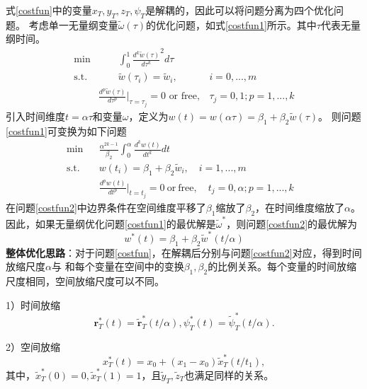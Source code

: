 式\ref{costfun}中的变量$x_T,y_T,z_T,\psi_T$是解耦的，因此可以将问题分离为四个优化问题。
考虑单一无量纲变量$\tilde{\omega}(\tau)$的优化问题，如式\ref{costfun1}所示。其中$\tau$代表无量纲时间。
\begin{equation}
    \begin{aligned}\label{costfun1}
    \text{min}&\quad\quad\int_0^1\frac{d^k\tilde{w}(\tau)}{d\tau^k}^2d\tau\\
    \text{s.t.}&\quad\quad\tilde{w}(\tau_i)=\tilde{w}_i,&i=0,...,m\\
    \quad&\frac{d^p\tilde{w}(\tau)}{d\tau^p}|_{\tau=\tau_j}=0\text{ or free},&\tau_j=0,1; p=1,...,k
\end{aligned}
\end{equation}
引入时间维度$t=\alpha \tau$和变量$\omega$，定义为$w(t)=w(\alpha\tau)=\beta_1+\beta_2\tilde{w}(\tau)$。
则问题\ref{costfun1}可变换为如下问题
\begin{equation}
\begin{aligned}\label{costfun2}
    &\text{min}&&\frac{\alpha^{2k-1}}{\beta_{2}}\int_{0}^{\alpha}\frac{d^{k}w(t)}{dt^{k}}dt&&\\
    &\text{s.t.}&&w(t_{i})=\beta_{1}+\beta_{2}\tilde{w}_{i},\quad i=1,...,m\\
    &&&\frac{d^{p}w(t)}{dt^{p}}|_{t=t_{j}}=0\mathrm{~or~free},\quad t_{j}=0,\alpha; p=1,...,k
\end{aligned}
\end{equation}
在问题\ref{costfun2}中边界条件在空间维度平移了$\beta_1$缩放了$\beta_2$，在时间维度缩放了$\alpha$。
因此，如果无量纲优化问题\ref{costfun1}的最优解是$\tilde{\omega}^*$，则问题\ref{costfun2}的最优解为
\begin{equation}
    w^*(t)=\beta_1+\beta_2\tilde{w}^*\left(t/\alpha\right)
\end{equation}
\textbf{整体优化思路}：对于问题\ref{costfun}，在解耦后分别与问题\ref{costfun2}对应，得到时间放缩尺度$\alpha$与
和每个变量在空间中的变换$\beta_1,\beta_2$的比例关系。每个变量的时间放缩尺度相同，空间放缩尺度可以不同。


1）时间放缩
\begin{equation}
    \mathbf{r}_T^*(t)=\mathbf{\tilde{r}}_T^*(t/\alpha), \psi_T^*(t)=\tilde{\psi}_T^*(t/\alpha).
\end{equation}


2）空间放缩
\begin{equation}
    x_T^*(t)=x_0+(x_1-x_0)\tilde{x}_T^*(t/t_1),
\end{equation}
其中，$\tilde{x}_T^*(0)=0,\tilde{x}_T^*(1)=1$，且$\tilde{y}_T,\tilde{z}_T$也满足同样的关系。